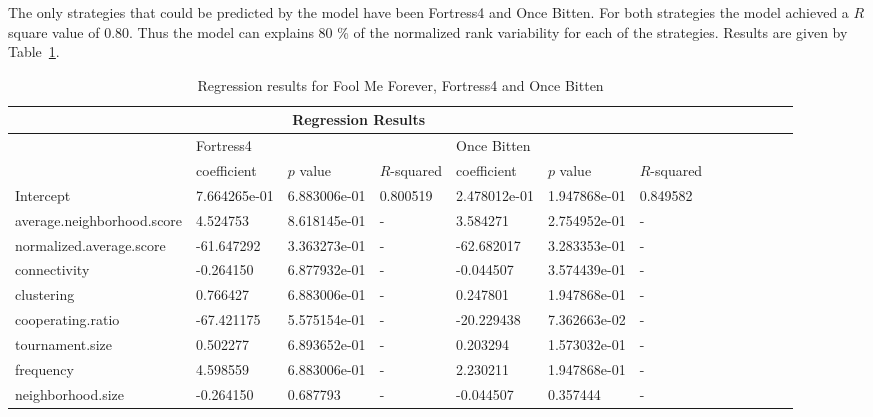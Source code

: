 The only strategies that could be predicted by the model have been Fortress4 and
Once Bitten. For both strategies the model achieved a \(R\) square value of
0.80. Thus the model can explains 80 \% of the normalized rank variability for
each of the strategies. Results are given by Table~\ref{reg-for-r-top}.

\begin{table}[!hbtp]
	\centering
	\begin{adjustbox}{width=0.9\textwidth}
		\small
		\begin{tabular}{|l|l|l|l|l|l|l|l|l|l|l|l|l|}
			\toprule
			\multicolumn{7}{|c|}{\textbf{Regression Results}}                                                                       \\ \hline
			&	\multicolumn{3}{l|}{Fortress4} & \multicolumn{3}{l|}{Once Bitten}\\ \hline
			  											   & coefficient & \(p\) value & \(R\)-squared & coefficient & \(p\) value & \(R\)-squared \\ \hline
			Intercept 								 & 7.664265e-01	& 6.883006e-01	& 0.800519	& 2.478012e-01 & 1.947868e-01 & 0.849582	\\ \hline
			average.neighborhood.score & 4.524753			& 8.618145e-01	& -					& 3.584271		 & 2.754952e-01	& -         \\ \hline
			normalized.average.score	 & -61.647292		& 3.363273e-01	& -					&-62.682017 	 & 3.283353e-01	& -         \\ \hline
			connectivity							 & -0.264150		& 6.877932e-01	& -					&-0.044507 		 & 3.574439e-01	& -         \\ \hline
			clustering  							 & 0.766427			& 6.883006e-01	& -					& 0.247801 		 & 1.947868e-01	& -         \\ \hline
			cooperating.ratio					 & -67.421175		& 5.575154e-01	& -					&-20.229438		 & 7.362663e-02	& -         \\ \hline
			tournament.size						 & 0.502277			& 6.893652e-01	& -					&0.203294  		 & 1.573032e-01	& -         \\ \hline
			frequency									 & 4.598559			& 6.883006e-01	& -					&2.230211  		 & 1.947868e-01	& -         \\ \hline
			neighborhood.size			   	 & -0.264150			& 0.687793		& -					&-0.044507 		 & 0.357444	& -         		\\ \bottomrule

		\end{tabular}
	\end{adjustbox}
	\caption{Regression results for ​Fool Me Forever, Fortress4 and Once Bitten}
	\label{reg-for-r-top}
\end{table}

